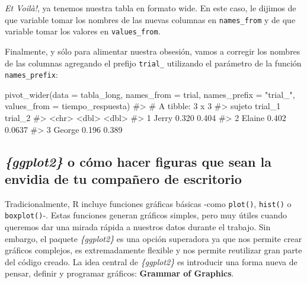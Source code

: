 \documentclass[
  letterpaper,
  DIV=11,
  numbers=noendperiod,
  oneside]{scrreprt}
\newenvironment{Shaded}{\begin{snugshade}}{\end{snugshade}}
\newcommand{\AttributeTok}[1]{\textcolor[rgb]{0.40,0.45,0.13}{#1}}
\newcommand{\CommentTok}[1]{\textcolor[rgb]{0.37,0.37,0.37}{#1}}
\newcommand{\FunctionTok}[1]{\textcolor[rgb]{0.28,0.35,0.67}{#1}}
\newcommand{\NormalTok}[1]{\textcolor[rgb]{0.00,0.23,0.31}{#1}}
\newcommand{\StringTok}[1]{\textcolor[rgb]{0.13,0.47,0.30}{#1}}
\begin{document}
\emph{Et Voilà!}, ya tenemos nuestra tabla en formato wide. En este
caso, le dijimos de que variable tomar los nombres de las nuevas
columnas en \texttt{names\_from} y de que variable tomar los valores en
\texttt{values\_from}.

Finalmente, y sólo para alimentar nuestra obsesión, vamos a corregir los
nombres de las columnas agregando el prefijo \texttt{trial\_} utilizando
el parámetro de la función \texttt{names\_prefix}:

\begin{Shaded}
\begin{Highlighting}[]
\FunctionTok{pivot\_wider}\NormalTok{(}\AttributeTok{data =}\NormalTok{ tabla\_long, }
            \AttributeTok{names\_from =}\NormalTok{ trial, }
            \AttributeTok{names\_prefix =} \StringTok{"trial\_"}\NormalTok{,}
            \AttributeTok{values\_from =}\NormalTok{ tiempo\_respuesta)}
\CommentTok{\#\textgreater{} \# A tibble: 3 x 3}
\CommentTok{\#\textgreater{}   sujeto trial\_1 trial\_2}
\CommentTok{\#\textgreater{}   \textless{}chr\textgreater{}    \textless{}dbl\textgreater{}   \textless{}dbl\textgreater{}}
\CommentTok{\#\textgreater{} 1 Jerry    0.320  0.404 }
\CommentTok{\#\textgreater{} 2 Elaine   0.402  0.0637}
\CommentTok{\#\textgreater{} 3 George   0.196  0.389}
\end{Highlighting}
\end{Shaded}

\hypertarget{ggplot2-o-cuxf3mo-hacer-figuras-que-sean-la-envidia-de-tu-compauxf1ero-de-escritorio}{%
\subsection{\texorpdfstring{\emph{\{ggplot2\}} o cómo hacer figuras que
sean la envidia de tu compañero de
escritorio}{\{ggplot2\} o cómo hacer figuras que sean la envidia de tu compañero de escritorio}}\label{ggplot2-o-cuxf3mo-hacer-figuras-que-sean-la-envidia-de-tu-compauxf1ero-de-escritorio}}

Tradicionalmente, R incluye funciones gráficas básicas -como
\texttt{plot()}, \texttt{hist()} o \texttt{boxplot()}-. Estas funciones
generan gráficos simples, pero muy útiles cuando queremos dar una mirada
rápida a nuestros datos durante el trabajo. Sin embargo, el paquete
\emph{\{ggplot2\}} es una opción superadora ya que nos permite crear
gráficos complejos, es extremadamente flexible y nos permite reutilizar
gran parte del código creado. La idea central de \emph{\{ggplot2\}} es
introducir una forma nueva de pensar, definir y programar gráficos:
\textbf{Grammar of Graphics}.
\end{document}

